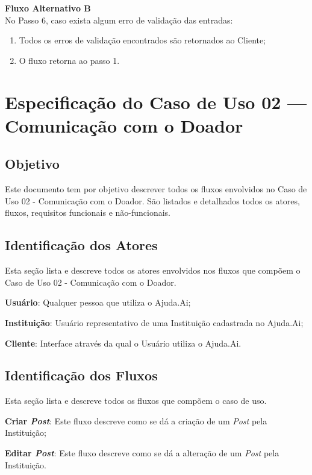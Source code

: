 \begin{lista}
    \textbf{Fluxo Alternativo B} \\
    No Passo 6, caso exista algum erro de validação das entradas:
    \begin{enumerate}
    \item Todos os erros de validação encontrados são retornados ao Cliente;
    \item O fluxo retorna ao passo 1.
    \end{enumerate}
\end{lista}
\pagebreak

\section*{Especificação do Caso de Uso 02 --- Comunicação com o Doador}
\subsection*{Objetivo}
Este documento tem por objetivo descrever todos os fluxos envolvidos no Caso de Uso 02 - Comunicação com o Doador. São listados e detalhados todos os atores, fluxos, requisitos funcionais e não-funcionais.

\subsection*{Identificação dos Atores}
Esta seção lista e descreve todos os atores envolvidos nos fluxos que compõem o Caso de Uso 02 - Comunicação com o Doador.
\begin{lista}
  \item \textbf{Usuário}: Qualquer pessoa que utiliza o Ajuda.Ai;
  \item \textbf{Instituição}: Usuário representativo de uma Instituição cadastrada no Ajuda.Ai;
  \item \textbf{Cliente}: Interface através da qual o Usuário utiliza o Ajuda.Ai.
\end{lista}

\subsection*{Identificação dos Fluxos}
Esta seção lista e descreve todos os fluxos que compõem o caso de uso.
\begin{lista}
  \item \textbf{Criar \emph{Post}}: Este fluxo descreve como se dá a criação de um \emph{Post} pela Instituição;
  \item \textbf{Editar \emph{Post}}: Este fluxo descreve como se dá a alteração de um \emph{Post} pela Instituição.
\end{lista}

